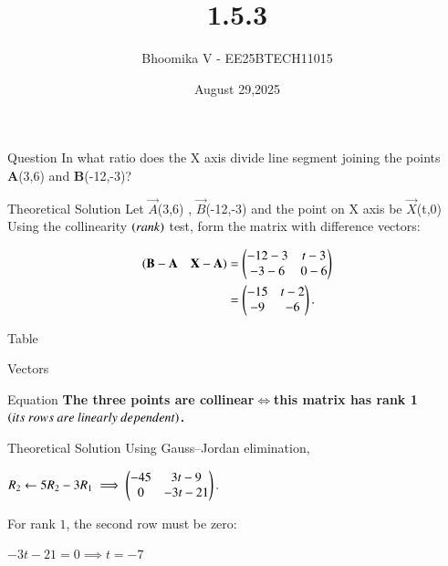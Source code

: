 \documentclass{beamer}
\begin{document}
\title 
{1.5.3}
\date{August 29,2025}


\author 
{Bhoomika V - EE25BTECH11015}




\frame{\titlepage}
\begin{frame}{Question}
 In what ratio does the X axis divide line segment joining the points \textbf{A}(3,6) and \textbf{B}(-12,-3)?
\end{frame}



\begin{frame}{Theoretical Solution}
Let $\vec{A}$(3,6) , $\vec{B}$(-12,-3) and the point on X axis be $\vec{X}$(t,0)\\
Using the collinearity $\left(rank\right)$ test, form the matrix with difference vectors:

\begin{align*}
(\mathbf{B}-\mathbf{A} \quad \mathbf{X}-\mathbf{A}) &= \begin{pmatrix}-12-3 & t-3 \\ -3-6 & 0-6\end{pmatrix} \\
    &= \begin{pmatrix}-15 & t-2 \\ -9 & -6\end{pmatrix}.
\end{align*}
\end{frame}

\begin{frame}{Table}
\begin{center}
\begin{table}[H]    
  \centering
  
  \caption{Vectors}
  \label{Answers}
\end{table}
\end{center}
\end{frame}

\begin{frame}{Equation}
\textbf{The three points are collinear$\iff$this matrix has rank 1 $\brak{its\ rows\ are\ linearly\ dependent}$.\\}
\end{frame}
\begin{frame}{Theoretical Solution}
Using Gauss–Jordan elimination,
\begin{center}
 $R_2 \leftarrow 5R_2 - 3R_1 \implies \begin{pmatrix} -45 & 3t-9 \\ 0 & -3t-21 \end{pmatrix}.$
 \end{center}

For rank $1$, the second row must be zero:
\begin{center}
$-3t - 21 = 0 \implies t = -7$
\end{center}
\end{frame}
\end{document}
